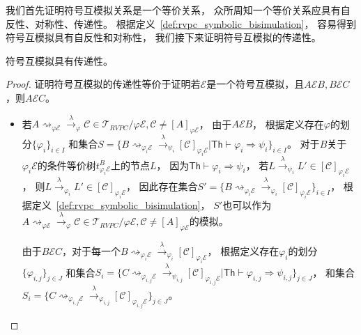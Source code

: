 我们首先证明符号互模拟关系是一个等价关系，
众所周知一个等价关系应具有自反性、对称性、传递性。
根据定义~\ref{def:rvpc_symbolic_bisimulation}，
容易得到符号互模拟具有自反性和对称性，
我们接下来证明符号互模拟的传递性。
\begin{lemma}\label{lemma:transitivity}
   符号互模拟具有传递性。
\end{lemma} 
\begin{proof}
   证明符号互模拟的传递性等价于证明若$\mathcal{E}$是一个符号互模拟，且$A\mathcal{E}B, B \mathcal{E} C$，则$A \mathcal{E} C$。
   \begin{itemize}
      \item {
         若$A\rightsquigarrow_{\varphi \mathcal{E}}\stackrel{\lambda}{\rightarrow}_{\varphi} \mathcal{C}\in \mathcal{T}_{RVPC}/\varphi\mathcal{E},\mathcal{C}\neq [A]_{\varphi\mathcal{E}}$，
         由于$A\mathcal{E}B$，
         根据定义存在$\varphi$的划分$\{\varphi_i\}_{i\in I}$
         和集合$S=\{B\rightsquigarrow_{\varphi_i\mathcal{E}}\stackrel{\lambda}{\rightarrow}_{\psi_i}[\mathcal{C}]_{\varphi_i\mathcal{E}}|\mathsf{Th}\vdash \varphi_i\Rightarrow\psi_i\}_{i\in I}$。
         对于$B$关于$\varphi_i\mathcal{E}$的条件等价树$t^B_{\varphi_i\mathcal{E}}$上的节点$L$，
         因为$\mathsf{Th}\vdash\varphi_i\Rightarrow \psi_i$，
         若$L\stackrel{\lambda}{\rightarrow}_{\psi_i}L'\in [\mathcal{C}]_{\varphi_i\mathcal{E}}$，
         则$L\stackrel{\lambda}{\rightarrow}_{\varphi_i}L'\in [\mathcal{C}]_{\varphi_i\mathcal{E}}$，
         因此存在集合$S'=\{B\rightsquigarrow_{\varphi_i\mathcal{E}}\stackrel{\lambda}{\rightarrow}_{\varphi_i}[\mathcal{C}]_{\varphi_i\mathcal{E}}\}_{i\in I}$，
         根据定义~\ref{def:rvpc_symbolic_bisimulation}，
         $S'$也可以作为$A\rightsquigarrow_{\varphi \mathcal{E}}\stackrel{\lambda}{\rightarrow}_{\varphi} \mathcal{C}\in \mathcal{T}_{RVPC}/\varphi\mathcal{E},\mathcal{C}\neq [A]_{\varphi\mathcal{E}}$的模拟。
      
         由于$B\mathcal{E}C$，对于每一个$B\rightsquigarrow_{\varphi_i\mathcal{E}}\stackrel{\lambda}{\rightarrow}_{\varphi_i}[\mathcal{C}]_{\varphi_i\mathcal{E}}$，
         根据定义存在$\varphi_i$的划分$\{\varphi_{i,j}\}_{j\in J}$
         和集合$S_i=\{C\rightsquigarrow_{\varphi_{i,j}\mathcal{E}}\stackrel{\lambda}{\rightarrow}_{\psi_{i,j}}[\mathcal{C}]_{\varphi_{i,j}\mathcal{E}}|\mathsf{Th}\vdash \varphi_{i,j}\Rightarrow \psi_{i,j}\}_{j\in J}$，
         和集合$S_i=\{C\rightsquigarrow_{\varphi_{i,j}\mathcal{E}}\stackrel{\lambda}{\rightarrow}_{\varphi_{i,j}}[\mathcal{C}]_{\varphi_{i,j}\mathcal{E}}\}_{j\in J}$。

}
\end{itemize}
\end{proof}
